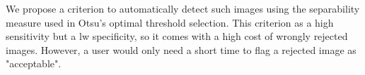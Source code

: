 \documentclass[a4paper,10pt]{article}
\begin{document}
We propose a criterion to automatically detect such images using the separability measure used in Otsu's optimal threshold selection. This criterion as a high sensitivity but a lw specificity, so it comes with a high cost of wrongly rejected images. However, a user would only need a short time to flag a rejected image as "acceptable".



\end{document}
